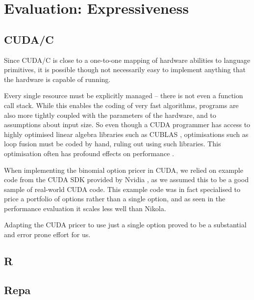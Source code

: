 \chapter{Evaluation: Expressiveness}


\section{CUDA/C}


Since CUDA/C is close to a one-to-one mapping of hardware abilities to language
primitives, it is possible though not necessarily easy to implement anything
that the hardware is capable of running.

Every single resource must be explicitly managed -- there is not even a
function call stack. While this enables the coding of very fast algorithms,
programs are also more tightly coupled with the parameters of the hardware, and
to assumptions about input size. So even though a CUDA programmer has access to
highly optimised linear algebra libraries such as CUBLAS \cite{CUBLAS2013},
optimisations such as loop fusion must be coded by hand, ruling out using such
libraries. This optimisation often has profound effects on performance
\cite{mainlandhaskell}.

When implementing the binomial option pricer in CUDA, we relied on example code
from the CUDA SDK provided by Nvidia \cite{CUDAbinomial}, as we assumed this to
be a good sample of real-world CUDA code. This example code was in fact
specialised to price a portfolio of options rather than a single option, and as
seen in the performance evaluation it scales less well than Nikola.

Adapting the CUDA pricer to use just a single option proved to be a substantial
and error prone effort for us.

\section{R}

\section{Repa}
